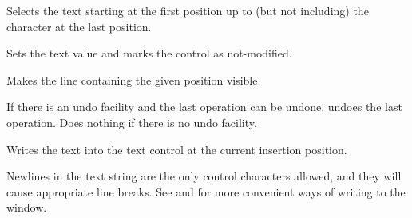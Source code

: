 \label{wxtextctrlsetselection}


Selects the text starting at the first position up to (but not including) the character at the last position.




\label{wxtextctrlsetvalue}


Sets the text value and marks the control as not-modified.



\label{wxtextctrlshowposition}


Makes the line containing the given position visible.



\label{wxtextctrlundo}


If there is an undo facility and the last operation can be undone, undoes the last operation. Does nothing
if there is no undo facility.

\label{wxtextctrlwritetext}


Writes the text into the text control at the current insertion position.




Newlines in the text string
are the only control characters allowed, and they will cause appropriate
line breaks.  See  and  for more convenient ways of writing to the window.

